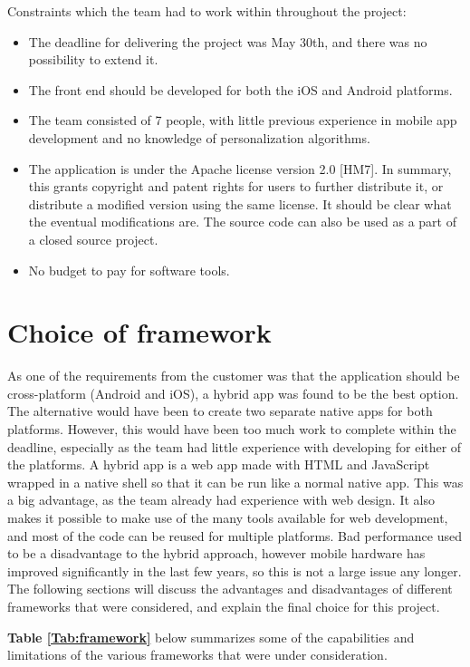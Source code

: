 Constraints which the team had to work within throughout the project:
\begin{itemize}
\item The deadline for delivering the project was May 30th, and there was no possibility to extend it.
\item The front end should be developed for both the iOS and Android platforms.
\item The team consisted of 7 people, with little previous experience in mobile app development and no knowledge of personalization algorithms.
\item The application is under the Apache license version 2.0 [HM7]. In summary, this grants copyright and patent rights for users to further distribute it, or distribute a modified version using the same license. It should be clear what the eventual modifications are. The source code can also be used as a part of a closed source project.
\item No budget to pay for software tools.
\end{itemize}

\section{Choice of framework}

As one of the requirements from the customer was that the application should be cross-platform (Android and iOS), a hybrid app was found to be the best option. The alternative would have been to create two separate native apps for both platforms. However, this would have been too much work to complete within the deadline, especially as the team had little experience with developing for either of the platforms. A hybrid app is a web app made with HTML and JavaScript wrapped in a native shell so that it can be run like a normal native app. This was a big advantage, as the team already had experience with web design. It also makes it possible to make use of the many tools available for web development, and most of the code can be reused for multiple platforms. Bad performance used to be a disadvantage to the hybrid approach, however mobile hardware has improved significantly in the last few years, so this is not a large issue any longer. The following sections will discuss the advantages and disadvantages of different frameworks that were considered, and explain the final choice for this project. \newline

\textbf{Table \ref{Tab:framework}} below summarizes some of the capabilities and limitations of the various frameworks that were under consideration.

